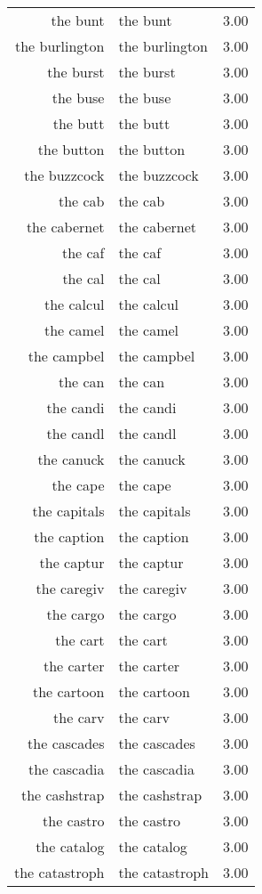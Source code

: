 \begin{table}[ht]
\begin{tabular}{rlr}
  the bunt & the bunt & 3.00 \\ 
  the burlington & the burlington & 3.00 \\ 
  the burst & the burst & 3.00 \\ 
  the buse & the buse & 3.00 \\ 
  the butt & the butt & 3.00 \\ 
  the button & the button & 3.00 \\ 
  the buzzcock & the buzzcock & 3.00 \\ 
  the cab & the cab & 3.00 \\ 
  the cabernet & the cabernet & 3.00 \\ 
  the caf & the caf & 3.00 \\ 
  the cal & the cal & 3.00 \\ 
  the calcul & the calcul & 3.00 \\ 
  the camel & the camel & 3.00 \\ 
  the campbel & the campbel & 3.00 \\ 
  the can & the can & 3.00 \\ 
  the candi & the candi & 3.00 \\ 
  the candl & the candl & 3.00 \\ 
  the canuck & the canuck & 3.00 \\ 
  the cape & the cape & 3.00 \\ 
  the capitals & the capitals & 3.00 \\ 
  the caption & the caption & 3.00 \\ 
  the captur & the captur & 3.00 \\ 
  the caregiv & the caregiv & 3.00 \\ 
  the cargo & the cargo & 3.00 \\ 
  the cart & the cart & 3.00 \\ 
  the carter & the carter & 3.00 \\ 
  the cartoon & the cartoon & 3.00 \\ 
  the carv & the carv & 3.00 \\ 
  the cascades & the cascades & 3.00 \\ 
  the cascadia & the cascadia & 3.00 \\ 
  the cashstrap & the cashstrap & 3.00 \\ 
  the castro & the castro & 3.00 \\ 
  the catalog & the catalog & 3.00 \\ 
  the catastroph & the catastroph & 3.00 \\ 

\end{tabular}
\end{table}

